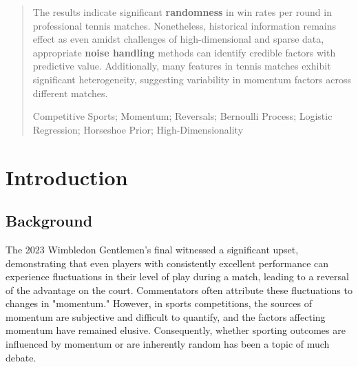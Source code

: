 \documentclass{mcmthesis}
\begin{document}
\begin{abstract}
The results indicate significant \textbf{randomness} in win rates per round in professional tennis matches. Nonetheless, historical information remains effect as even amidst challenges of high-dimensional and sparse data, appropriate \textbf{noise handling} methods can identify credible factors with predictive value. Additionally, many features in tennis matches exhibit significant heterogeneity, suggesting variability in momentum factors across different matches.  
  
\begin{keywords}
Competitive Sports; Momentum; Reversals; Bernoulli Process; Logistic Regression; Horseshoe Prior; High-Dimensionality
\end{keywords}
\end{abstract}


\maketitle
 \tableofcontents
 \newpage
\section{Introduction}

\subsection{Background}

The 2023 Wimbledon Gentlemen’s final witnessed a significant upset, demonstrating that even players with consistently excellent performance can experience fluctuations in their level of play during a match, leading to a reversal of the advantage on the court. Commentators often attribute these fluctuations to changes in "momentum." However, in sports competitions, the sources of momentum are subjective and difficult to quantify, and the factors affecting momentum have remained elusive. Consequently, whether sporting outcomes are influenced by momentum or are inherently random has been a topic of much debate.
\end{document}
